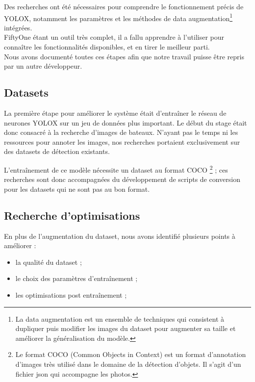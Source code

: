 Des recherches ont été nécessaires pour comprendre le fonctionnement précis de YOLOX,
notamment les paramètres et les méthodes de data augmentation\footnote{La
data augmentation est un ensemble de techniques qui consistent à dupliquer puis modifier les images
du dataset pour augmenter sa taille et améliorer la généralisation du modèle.} intégrées. \\

FiftyOne étant un outil très complet, il a fallu apprendre à l'utiliser pour connaître
les fonctionnalités disponibles, et en tirer le meilleur parti. \\


Nous avons documenté toutes ces étapes afin que notre travail puisse être repris par un autre
développeur.\\

\subsection{Datasets}

La première étape pour améliorer le système était d'entraîner le réseau de neurones YOLOX
sur un jeu de données plus important. Le début du stage était donc consacré à la recherche
d'images de bateaux. N'ayant pas le temps ni les ressources pour annoter les images,
nos recherches portaient exclusivement sur des datasets de détection existants.

L'entraînement de ce modèle nécessite un dataset au format COCO
\footnote{Le format COCO (Common Objects in Context) est un format d'annotation
d'images très utilisé dans le domaine de la détection d'objets. Il s'agit d'un fichier
json qui accompagne les photos.} ; ces recherches sont donc accompagnées du développement
de scripts de conversion pour les datasets qui ne sont pas au bon format.\\

\subsection{Recherche d'optimisations}

En plus de l'augmentation du dataset, nous avons identifié plusieurs points à améliorer :

\begin{itemize}
    \item la qualité du dataset ;
    \item le choix des paramètres d'entraînement ;
    \item les optimisations post entraînement ;
\end{itemize}

